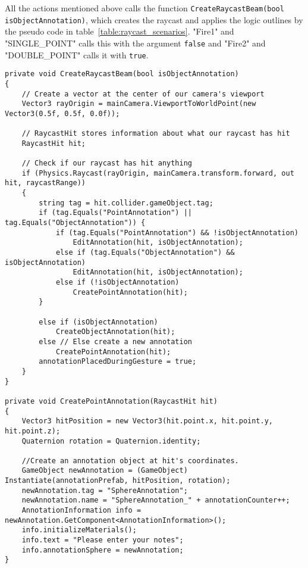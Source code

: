 All the actions mentioned above calls the function \texttt{CreateRaycastBeam(bool isObjectAnnotation)}, which creates the raycast and applies the logic outlines by the 
pseudo code in table~\vref{table:raycast_scenarios}. 
"Fire1" and "SINGLE\_POINT" calls this with the argument \texttt{false} and "Fire2" and "DOUBLE\_POINT" calls it with \texttt{true}.

\begin{table}
\label{table:movement_gesture_code}
\lstset{style=csharp}
\begin{lstlisting}
private void CreateRaycastBeam(bool isObjectAnnotation)
{
    // Create a vector at the center of our camera's viewport
    Vector3 rayOrigin = mainCamera.ViewportToWorldPoint(new Vector3(0.5f, 0.5f, 0.0f));

    // RaycastHit stores information about what our raycast has hit
    RaycastHit hit;

    // Check if our raycast has hit anything
    if (Physics.Raycast(rayOrigin, mainCamera.transform.forward, out hit, raycastRange))
    {
        string tag = hit.collider.gameObject.tag;    
        if (tag.Equals("PointAnnotation") || tag.Equals("ObjectAnnotation")) {
            if (tag.Equals("PointAnnotation") && !isObjectAnnotation)
                EditAnnotation(hit, isObjectAnnotation);
            else if (tag.Equals("ObjectAnnotation") && isObjectAnnotation)
                EditAnnotation(hit, isObjectAnnotation);
            else if (!isObjectAnnotation)
                CreatePointAnnotation(hit);
        }

        else if (isObjectAnnotation)
            CreateObjectAnnotation(hit);
        else // Else create a new annotation
            CreatePointAnnotation(hit);
        annotationPlacedDuringGesture = true;
    }
} 

private void CreatePointAnnotation(RaycastHit hit)
{
    Vector3 hitPosition = new Vector3(hit.point.x, hit.point.y, hit.point.z);
    Quaternion rotation = Quaternion.identity;

    //Create an annotation object at hit's coordinates. 
    GameObject newAnnotation = (GameObject) Instantiate(annotationPrefab, hitPosition, rotation);
    newAnnotation.tag = "SphereAnnotation";
    newAnnotation.name = "SphereAnnotation_" + annotationCounter++;
    AnnotationInformation info = newAnnotation.GetComponent<AnnotationInformation>();
    info.initializeMaterials();
    info.text = "Please enter your notes";
    info.annotationSphere = newAnnotation;
}


\end{lstlisting}
\end{table}
